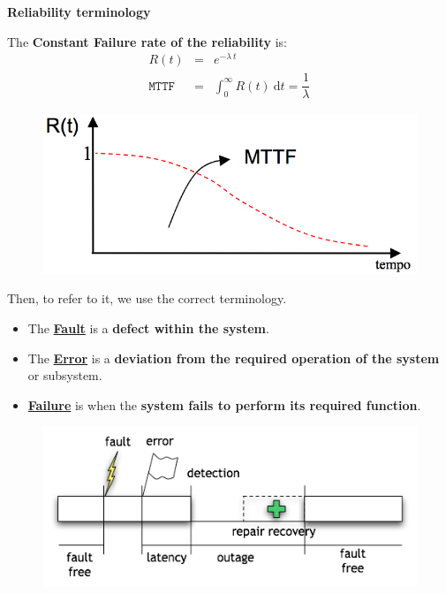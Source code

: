 \newpage

\begin{flushleft}
    \textcolor{Red2}{ \textbf{Reliability terminology}}
\end{flushleft}
The \textbf{Constant Failure rate of the reliability} is:
\begin{equation}
    \begin{array}{rcl}
        R\left(t\right) &=& e^{-\lambda \: t} \\ [.5em]
        \texttt{MTTF} &=& \displaystyle\int_{0}^{\infty} R\left(t\right) \:\mathrm{d}t = \dfrac{1}{\lambda}
    \end{array}
\end{equation}
\begin{figure}[!htp]
    \centering
    \includegraphics[width=.5\textwidth]{img/reliability-and-availability-4.png}
\end{figure}

\noindent
Then, to refer to it, we use the correct terminology.
\begin{itemize}
    \item The \underline{\textbf{Fault}} is a \textbf{defect within the system}.
    \item The \underline{\textbf{Error}} is a \textbf{deviation from the required operation of the system} or subsystem.
    \item \underline{\textbf{Failure}} is when the \textbf{system fails to perform its required function}.
\end{itemize}
\begin{figure}[!htp]
    \centering
    \includegraphics[width=.8\textwidth]{img/reliability-and-availability-3.png}
\end{figure}

